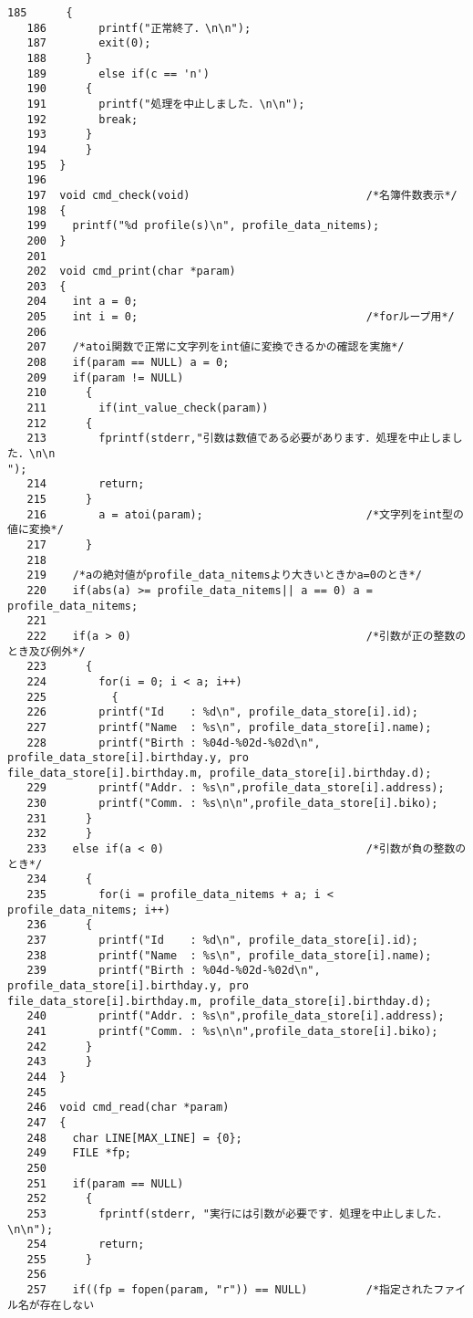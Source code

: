 \begin{Verbatim}[fontsize=\small, baselinestretch=0.8]
   185	  	{
   186	  	  printf("正常終了．\n\n");
   187		  exit(0);
   188		}
   189	      else if(c == 'n')
   190		{
   191		  printf("処理を中止しました．\n\n");
   192		  break;
   193		}
   194	    }
   195	}
   196	
   197	void cmd_check(void)                           /*名簿件数表示*/
   198	{
   199	  printf("%d profile(s)\n", profile_data_nitems);
   200	}
   201	
   202	void cmd_print(char *param)
   203	{
   204	  int a = 0;
   205	  int i = 0;                                   /*forループ用*/
   206	
   207	  /*atoi関数で正常に文字列をint値に変換できるかの確認を実施*/
   208	  if(param == NULL) a = 0;
   209	  if(param != NULL)
   210	    {
   211	      if(int_value_check(param))
   212		{
   213		  fprintf(stderr,"引数は数値である必要があります．処理を中止しました．\n\n
");
   214		  return;
   215		}
   216	      a = atoi(param);                         /*文字列をint型の値に変換*/
   217	    }
   218	
   219	  /*aの絶対値がprofile_data_nitemsより大きいときかa=0のとき*/
   220	  if(abs(a) >= profile_data_nitems|| a == 0) a = profile_data_nitems;
   221	
   222	  if(a > 0)                                    /*引数が正の整数のとき及び例外*/
   223	    {
   224	      for(i = 0; i < a; i++)
   225	        {
   226		  printf("Id    : %d\n", profile_data_store[i].id);
   227		  printf("Name  : %s\n", profile_data_store[i].name);
   228		  printf("Birth : %04d-%02d-%02d\n", profile_data_store[i].birthday.y, pro
file_data_store[i].birthday.m, profile_data_store[i].birthday.d);
   229		  printf("Addr. : %s\n",profile_data_store[i].address);
   230		  printf("Comm. : %s\n\n",profile_data_store[i].biko);
   231		}
   232	    }
   233	  else if(a < 0)                               /*引数が負の整数のとき*/
   234	    {
   235	      for(i = profile_data_nitems + a; i < profile_data_nitems; i++)
   236		{
   237		  printf("Id    : %d\n", profile_data_store[i].id);
   238		  printf("Name  : %s\n", profile_data_store[i].name);
   239		  printf("Birth : %04d-%02d-%02d\n", profile_data_store[i].birthday.y, pro
file_data_store[i].birthday.m, profile_data_store[i].birthday.d);
   240		  printf("Addr. : %s\n",profile_data_store[i].address);
   241		  printf("Comm. : %s\n\n",profile_data_store[i].biko);
   242		}
   243	    }
   244	}
   245	
   246	void cmd_read(char *param)
   247	{
   248	  char LINE[MAX_LINE] = {0};
   249	  FILE *fp;
   250	
   251	  if(param == NULL)
   252	    {
   253	      fprintf(stderr, "実行には引数が必要です．処理を中止しました．\n\n");
   254	      return;
   255	    }
   256	
   257	  if((fp = fopen(param, "r")) == NULL)         /*指定されたファイル名が存在しない

\end{Verbatim}
